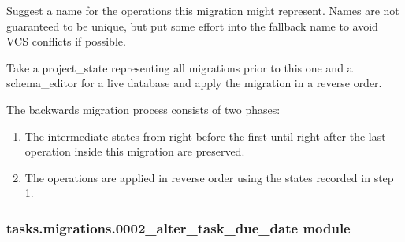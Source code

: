 \documentclass[letterpaper,10pt,english]{sphinxmanual}
\begin{document}
\begin{fulllineitems}
\begin{fulllineitems}
\label{\detokenize{tasks.migrations:tasks.migrations.0001_initial.Migration.suggest_name}}
\pysigstartsignatures
{}
\pysigstopsignatures
\sphinxAtStartPar
Suggest a name for the operations this migration might represent. Names
are not guaranteed to be unique, but put some effort into the fallback
name to avoid VCS conflicts if possible.

\end{fulllineitems}


\begin{fulllineitems}
\label{\detokenize{tasks.migrations:tasks.migrations.0001_initial.Migration.unapply}}
\pysigstartsignatures
{}
\pysigstopsignatures
\sphinxAtStartPar
Take a project\_state representing all migrations prior to this one
and a schema\_editor for a live database and apply the migration
in a reverse order.

\sphinxAtStartPar
The backwards migration process consists of two phases:
\begin{enumerate}
%
\item {} 
\sphinxAtStartPar
The intermediate states from right before the first until right
after the last operation inside this migration are preserved.

\item {} 
\sphinxAtStartPar
The operations are applied in reverse order using the states
recorded in step 1.

\end{enumerate}

\end{fulllineitems}


\end{fulllineitems}



\subsubsection{tasks.migrations.0002\_alter\_task\_due\_date module}
\label{\detokenize{tasks.migrations:module-tasks.migrations.0002_alter_task_due_date}}\label{\detokenize{tasks.migrations:tasks-migrations-0002-alter-task-due-date-module}}
\end{document}
